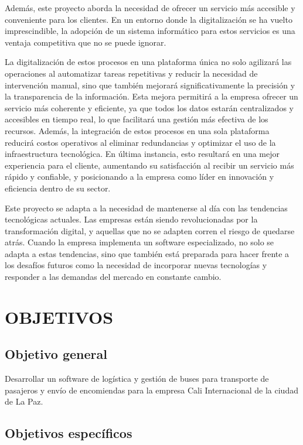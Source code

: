 \documentclass[12pt,letterpaper]{article}
\begin{document}
Además, este proyecto aborda la necesidad de ofrecer un servicio más accesible y conveniente para los clientes. En un entorno donde la digitalización se ha vuelto imprescindible, la adopción de un sistema informático para estos servicios es una ventaja competitiva que no se puede ignorar.

La digitalización de estos procesos en una plataforma única no solo agilizará las operaciones al automatizar tareas repetitivas y reducir la necesidad de intervención manual, sino que también mejorará significativamente la precisión y la transparencia de la información. Esta mejora permitirá a la empresa ofrecer un servicio más coherente y eficiente, ya que todos los datos estarán centralizados y accesibles en tiempo real, lo que facilitará una gestión más efectiva de los recursos. Además, la integración de estos procesos en una sola plataforma reducirá costos operativos al eliminar redundancias y optimizar el uso de la infraestructura tecnológica. En última instancia, esto resultará en una mejor experiencia para el cliente, aumentando su satisfacción al recibir un servicio más rápido y confiable, y posicionando a la empresa como líder en innovación y eficiencia dentro de su sector.

Este proyecto se adapta a la necesidad de mantenerse al día con las tendencias tecnológicas actuales. Las empresas están siendo revolucionadas por la transformación digital, y aquellas que no se adapten corren el riesgo de quedarse atrás. Cuando la empresa implementa un software especializado, no solo se adapta a estas tendencias, sino que también está preparada para hacer frente a los desafíos futuros como la necesidad de incorporar nuevas tecnologías y responder a las demandas del mercado en constante cambio.

\section{OBJETIVOS}

\subsection{Objetivo general}

Desarrollar un software de logística y gestión de buses para transporte de pasajeros y envío de encomiendas para la empresa Cali Internacional de la ciudad de La Paz.

\subsection{Objetivos específicos}
\end{document}
